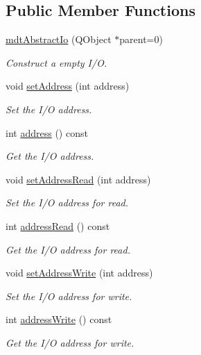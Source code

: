 \subsection*{Public Member Functions}
\begin{DoxyCompactItemize}
\item 
\hyperlink{classmdt_abstract_io_ac138b89890471e0412f2b15f2c53f1f9}{mdtAbstractIo} (QObject $\ast$parent=0)
\begin{DoxyCompactList}\small\item\em Construct a empty I/O. \end{DoxyCompactList}\item 
void \hyperlink{classmdt_abstract_io_a1f3bfa0472c7e0bd4cd9a5b865c460a2}{setAddress} (int address)
\begin{DoxyCompactList}\small\item\em Set the I/O address. \end{DoxyCompactList}\item 
int \hyperlink{classmdt_abstract_io_a52f071b6c1098e74f82eade9ead5382a}{address} () const 
\begin{DoxyCompactList}\small\item\em Get the I/O address. \end{DoxyCompactList}\item 
void \hyperlink{classmdt_abstract_io_ac2eecb238c3eb41d124c79e6dd363424}{setAddressRead} (int address)
\begin{DoxyCompactList}\small\item\em Set the I/O address for read. \end{DoxyCompactList}\item 
int \hyperlink{classmdt_abstract_io_a710119785e128ca39092e99593bc7dac}{addressRead} () const 
\begin{DoxyCompactList}\small\item\em Get the I/O address for read. \end{DoxyCompactList}\item 
void \hyperlink{classmdt_abstract_io_a34082150ca24fe27245ceb515de1168b}{setAddressWrite} (int address)
\begin{DoxyCompactList}\small\item\em Set the I/O address for write. \end{DoxyCompactList}\item 
int \hyperlink{classmdt_abstract_io_aa62d29a8f8f97b3c8e382ad608048ab4}{addressWrite} () const 
\begin{DoxyCompactList}\small\item\em Get the I/O address for write. \end{DoxyCompactList}\item 

\end{DoxyCompactItemize}
